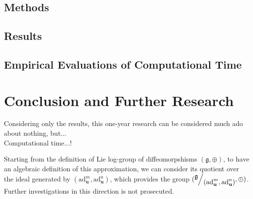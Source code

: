 \subsection{Methods}

\subsection{Results}


\subsection{Empirical Evaluations of Computational Time}


\section{Conclusion and Further Research}\label{ch:conclusions}


Considering only the results, this one-year research can be considered much ado about nothing, but...\\
Computational time...!

Starting from the definition of Lie log-group of diffeomorpshisms $(\mathfrak{g} , \oplus)$, to have an algebraic definition of this approximation, we can consider its quotient over the ideal generated by $(\text{ad}_{\mathbf{u}}^{m}, \text{ad}_{\mathbf{u}}^{n})$, which provides the group $(\quotient{\mathfrak{g}}{(\text{ad}_{\mathbf{u}}^{m}, \text{ad}_{\mathbf{u}}^{n})}, \oplus)$. Further investigations in this direction is not prosecuted.
